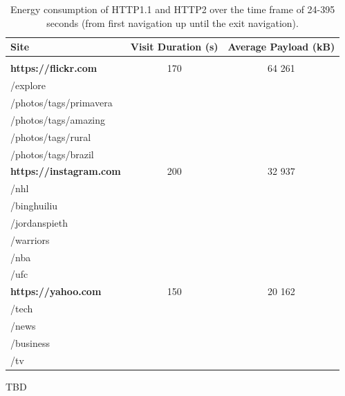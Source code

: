 \documentclass{article}
\begin{document}
\begin{table}[h!]
    \caption{Energy consumption of HTTP1.1 and HTTP2 over the time frame of 24-395 seconds (from first navigation up until the exit navigation).}
    \label{table:url_manifest}
    \begin{tabular}{lcc}
        \textbf{Site} & \textbf{Visit Duration (s)} & \textbf{Average Payload (kB)} \\
        \hline \vspace{-3mm}\\
        \textbf{https://flickr.com} & 170 & 64 261 \\
        \hspace{1em} /explore \\
        \hspace{1em} /photos/tags/primavera \\
        \hspace{1em} /photos/tags/amazing \\
        \hspace{1em} /photos/tags/rural \\
        \hspace{1em} /photos/tags/brazil \vspace{1mm}\\
        \textbf{https://instagram.com} & 200 & 32 937 \\
        \hspace{1em} /nhl \\
        \hspace{1em} /binghuiliu \\
        \hspace{1em} /jordanspieth \\
        \hspace{1em} /warriors \\
        \hspace{1em} /nba \\
        \hspace{1em} /ufc \vspace{1mm}\\
        \textbf{https://yahoo.com} & 150 & 20 162 \\
        \hspace{1em} /tech \\
        \hspace{1em} /news \\
        \hspace{1em} /business \\
        \hspace{1em} /tv \vspace{1mm}\\
    \end{tabular}
\end{table}
TBD
\end{document}
